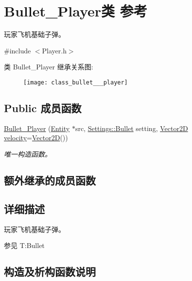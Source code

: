 \hypertarget{class_bullet___player}{}\section{Bullet\+\_\+\+Player类 参考}
\label{class_bullet___player}


玩家飞机基础子弹。  




{\ttfamily \#include $<$Player.\+h$>$}

类 Bullet\+\_\+\+Player 继承关系图\+:\begin{figure}[H]
\begin{center}
\leavevmode
\texttt{[image: class\_bullet\_\_\_player]}
\end{center}
\end{figure}
\subsection*{Public 成员函数}
\begin{DoxyCompactItemize}
\item 
\hyperlink{class_bullet___player_abcb87ef10b028f5fd603c70b4cda20d3}{Bullet\+\_\+\+Player} (\hyperlink{class_entity}{Entity} $\ast$src, \hyperlink{struct_settings_1_1_bullet}{Settings\+::\+Bullet} setting, \hyperlink{structbasic__vector2_d}{Vector2D} \hyperlink{class_entity_a386d25b56772b8913eb3e5adc636f6e0}{velocity}=\hyperlink{structbasic__vector2_d}{Vector2D}())
\begin{DoxyCompactList}\small\item\em 唯一构造函数。 \end{DoxyCompactList}\end{DoxyCompactItemize}
\subsection*{额外继承的成员函数}


\subsection{详细描述}
玩家飞机基础子弹。 

\begin{DoxySeeAlso}{参见}
T\+:\+Bullet


\end{DoxySeeAlso}


\subsection{构造及析构函数说明}
\mbox{\label{class_bullet___player_abcb87ef10b028f5fd603c70b4cda20d3}} 
